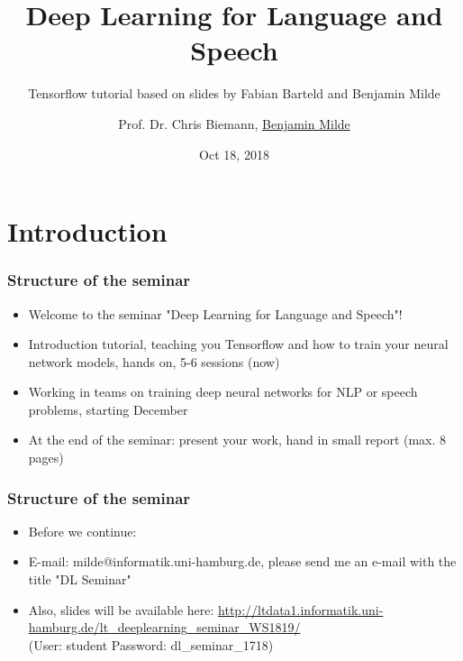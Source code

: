 \documentclass{beamer}
\title{Deep Learning for Language and Speech}
\subtitle{Tensorflow tutorial based on slides by Fabian Barteld and Benjamin Milde}
\author{Prof. Dr. Chris Biemann, \underline{Benjamin Milde}}
\date[18.10.2018]{Oct 18, 2018}
\begin{document}
\maketitle

%

\section{Introduction}

\begin{frame}
\frametitle{Structure of the seminar}
  \begin{itemize}
    \item Welcome to the seminar "Deep Learning for Language and Speech"!
  	\item Introduction tutorial, teaching you Tensorflow and how to train your neural network models, hands on, 5-6 sessions (now)
  	\item Working in teams on training deep neural networks for NLP or speech problems, starting December
  	 \item At the end of the seminar: present your work, hand in small report (max. 8 pages)
  \end{itemize}
\end{frame}

\begin{frame}
\frametitle{Structure of the seminar}
  \begin{itemize}
	\item Before we continue:
  	\item E-mail: milde@informatik.uni-hamburg.de, please send me an e-mail with the title "DL Seminar"
  	\item Also, slides will be available here: \url{http://ltdata1.informatik.uni-hamburg.de/lt_deeplearning_seminar_WS1819/} \\ (User: student Password: dl\_seminar\_1718)
  \end{itemize}
\end{frame}
\end{document}

